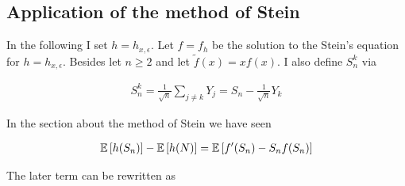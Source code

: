 \subsection{Application of the method of Stein}

In the following I set $h=h_{x,\epsilon}$. Let $f=f_h$ be the solution to the Stein's equation for $h=h_{x,\epsilon}$. Besides let $n \ge 2$ and let $\tilde f(x)=xf(x)$. I also define $S_n^k$ via

\begin{align}
  S_n^k = \frac 1{\sqrt{n}} \sum_{j\neq k} Y_j = S_n - \frac 1{\sqrt n} Y_k
\end{align}

\noindent In the section about the method of Stein we have seen

\begin{align}
  \mathbb E\left[{h(S_n)}\right]-\mathbb E\left[{h(N)}\right]=\mathbb E\left[{f'(S_n)-S_n f(S_n)}\right]
\end{align}

\noindent The later term can be rewritten as

